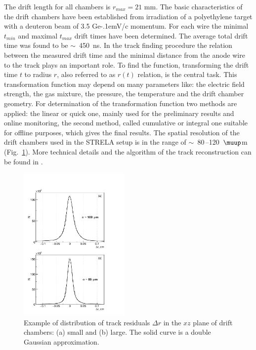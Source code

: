 \documentclass[twocolumn,epjc3]{svjour3}
\newcommand{\GeVc}   {Ge\kern-.1emV/c\xspace}
\begin{document}
The drift length for all chambers is $r_{max} = 21$ mm. The basic
characteristics of the drift chambers have been established from irradiation of
a polyethylene target with a deuteron beam of 3.5 \GeVc momentum. For each wire
the minimal $t_{min}$ and maximal $t_{max}$ drift times have been
determined. The average total drift time was found to be $\sim$~450~ns. In the
track finding procedure the relation between the measured drift time and the
minimal distance from the anode wire to the track plays an important role. To
find the function, transforming the drift time $t$ to radius $r$, also referred
to as $r(t)$ relation, is the central task. This transformation function may
depend on many parameters like: the electric field strength, the gas mixture,
the pressure, the temperature and the drift chamber geometry. For determination
of the transformation function two methods are applied: the linear or quick one,
mainly used for the preliminary results and online monitoring, the second
method, called cumulative or integral one suitable for offline purposes, which
gives the final results. The spatial resolution of the drift chambers used in
the STRELA setup is in the range of $\sim$~80\,--120~$\muup$m
(Fig.~\ref{fig:res_chambers}). More technical details and the algorithm of the
track reconstruction can be found in \cite{gla13}.

\begin{figure}[ht]
  \centering
  \includegraphics[width=0.48\textwidth]{res_chambers.pdf}
  \caption{Example of distribution of track residuals $\Delta r$ in the $xz$
    plane of drift chambers: (a) small and (b) large. The solid curve is a
    double Gaussian approximation.}
  \label{fig:res_chambers}
\end{figure}
\end{document}
